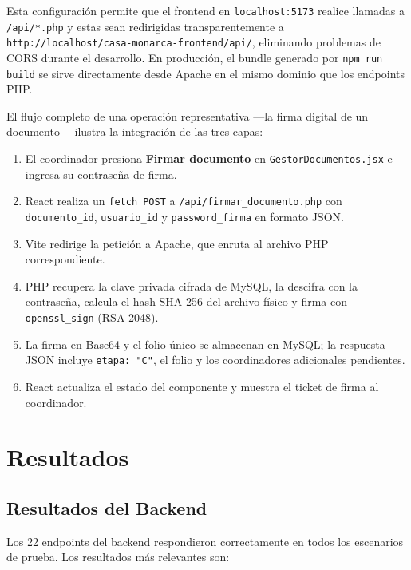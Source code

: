 \documentclass[10pt,letterpaper]{report}
\begin{document}
Esta configuración permite que el frontend en \texttt{localhost:5173} realice llamadas a \texttt{/api/*.php} y estas sean redirigidas transparentemente a \texttt{http://localhost/casa-monarca-frontend/api/}, eliminando problemas de CORS durante el desarrollo. En producción, el bundle generado por \texttt{npm run build} se sirve directamente desde Apache en el mismo dominio que los endpoints PHP.

El flujo completo de una operación representativa —la firma digital de un documento— ilustra la integración de las tres capas:

\begin{enumerate}[label=\arabic*.]
  \item El coordinador presiona \textbf{Firmar documento} en \texttt{GestorDocumentos.jsx} e ingresa su contraseña de firma.
  \item React realiza un \texttt{fetch POST} a \texttt{/api/firmar\_documento.php} con \texttt{documento\_id}, \texttt{usuario\_id} y \texttt{password\_firma} en formato JSON.
  \item Vite redirige la petición a Apache, que enruta al archivo PHP correspondiente.
  \item PHP recupera la clave privada cifrada de MySQL, la descifra con la contraseña, calcula el hash SHA-256 del archivo físico y firma con \texttt{openssl\_sign} (RSA-2048).
  \item La firma en Base64 y el folio único se almacenan en MySQL; la respuesta JSON incluye \texttt{etapa: "C"}, el folio y los coordinadores adicionales pendientes.
  \item React actualiza el estado del componente y muestra el ticket de firma al coordinador.
\end{enumerate}

\chapter{Resultados}

\section{Resultados del Backend}

Los 22 endpoints del backend respondieron correctamente en todos los escenarios de prueba. Los resultados más relevantes son:
\end{document}
